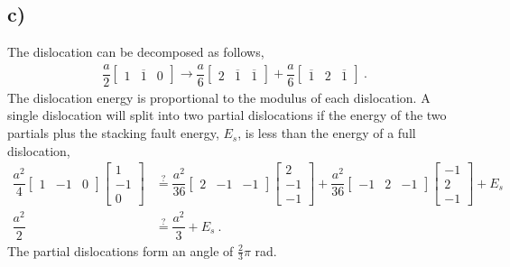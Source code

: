 \documentclass[a4paper]{article}
\begin{document}
	\subsection{c)}
	The dislocation can be decomposed as follows,
	\begin{align}
		\dfrac{a}{2}
		\begin{bmatrix}
		1 & \overline{1} & 0 
		\end{bmatrix}
		\to
		\dfrac{a}{6}
		\begin{bmatrix}
		2 & \overline{1} & \overline{1} 
		\end{bmatrix}
		+
		\dfrac{a}{6}
		\begin{bmatrix}
		\overline{1} & 2 & \overline{1} 
		\end{bmatrix}~.
	\end{align}
	The dislocation energy is proportional to the modulus of each dislocation. A single dislocation will split into two partial dislocations if the energy of the two partials plus the stacking fault energy, $E_{s}$, is less than the energy of a full dislocation,
	\begin{subequations}
	\begin{align}
		\dfrac{a^{2}}{4} 
		\begin{bmatrix}
			1 & -1 & 0 
		\end{bmatrix}
		\begin{bmatrix}
		1\\ -1\\ 0 
		\end{bmatrix} 
		&\overset{?}{=}
		\dfrac{a^{2}}{36}
		\begin{bmatrix}
		2 & -1 & -1
		\end{bmatrix}
		\begin{bmatrix}
		2 \\ -1 \\ -1
		\end{bmatrix}
		+
		\dfrac{a^{2}}{36}
		\begin{bmatrix}
		-1 & 2 & -1
		\end{bmatrix}
		\begin{bmatrix}
		-1\\ 2 \\ -1
		\end{bmatrix}
		+ E_{s}\\
		\dfrac{a^{2}}{2} &\overset{?}{=} \dfrac{a^{2}}{3} + E_{s}~.
	\end{align}
	\end{subequations}
	The partial dislocations form an angle of $\frac{2}{3}\pi$ rad.
\end{document}
